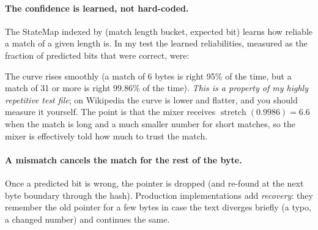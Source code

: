 \documentclass[11pt,a4paper,openany]{book}
\newcommand{\st}{\operatorname{stretch}}
\theoremstyle{definition}
\theoremstyle{remark}
\begin{document}
\paragraph{The confidence is learned, not hard-coded.} The StateMap indexed by (match length bucket, expected bit) learns how reliable a match of a given length is. In my test the learned reliabilities, measured as the fraction of predicted bits that were correct, were:

\begin{center}
\end{center}

The curve rises smoothly (a match of 6 bytes is right 95\% of the time, but a match of 31 or more is right 99.86\% of the time). \emph{This is a property of my highly repetitive test file}; on Wikipedia the curve is lower and flatter, and you should measure it yourself. The point is that the mixer receives $\st(0.9986)=6.6$ when the match is long and a much smaller number for short matches, so the mixer is effectively told how much to trust the match.

\paragraph{A mismatch cancels the match for the rest of the byte.} Once a predicted bit is wrong, the pointer is dropped (and re-found at the next byte boundary through the hash). Production implementations add \emph{recovery}: they remember the old pointer for a few bytes in case the text diverges briefly (a typo, a changed number) and continues the same.
\end{document}
